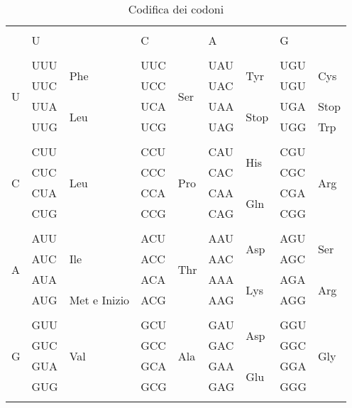 \begin{fullpaper}
    \begin{table}
    \begin{tabularx}{0.9\textwidth}{lXXXXXXXX}
    \toprule{}\\
    & U & & C & & A & & G\\
    \midrule{}\\
    \multirow{4}{*}{U}
    & UUU & \multirow{2}{*}{Phe} & UUC & \multirow{4}{*}{Ser} & UAU & \multirow{2}{*}{Tyr} & UGU &\multirow{2}{*}{Cys}\\
    & UUC & & UCC & & UAC & & UGU \\
    & UUA & \multirow{2}{*}{Leu} & UCA & & UAA & \multirow{2}{*}{Stop} & UGA & Stop\\
    & UUG & & UCG & & UAG & & UGG & Trp\\
    \midrule{}\\
    \multirow{4}{*}{C}
    & CUU & \multirow{4}{*}{Leu} & CCU & \multirow{4}{*}{Pro} & CAU & \multirow{2}{*}{His} & CGU & \multirow{4}{*}{Arg} \\
    & CUC & & CCC & & CAC & & CGC & \\
    & CUA & & CCA & & CAA & \multirow{2}{*}{Gln} & CGA & \\
    & CUG & & CCG & & CAG & & CGG & \\
    \midrule{}\\
    \multirow{4}{*}{A}
    & AUU & \multirow{3}{*}{Ile} & ACU & \multirow{4}{*}{Thr} & AAU & \multirow{2}{*}{Asp} & AGU & \multirow{2}{*}{Ser} \\
    & AUC & & ACC & & AAC & & AGC & \\
    & AUA & & ACA & & AAA & \multirow{2}{*}{Lys} & AGA & \multirow{2}{*}{Arg} \\ 
    & AUG & Met e Inizio & ACG & & AAG & & AGG & \\
    \midrule{}\\
    \multirow{4}{*}{G}
    & GUU & \multirow{4}{*}{Val} & GCU & \multirow{4}{*}{Ala} & GAU & \multirow{2}{*}{Asp} & GGU & \multirow{4}{*}{Gly}\\
    & GUC & & GCC & & GAC & & GGC & \\
    & GUA & & GCA & & GAA & \multirow{2}{*}{Glu} & GGA & \\
    & GUG & & GCG & & GAG & & GGG & \\
    \bottomrule{}
    \end{tabularx}
    \caption{Codifica dei codoni}
    \end{table}
    \end{fullpaper}

